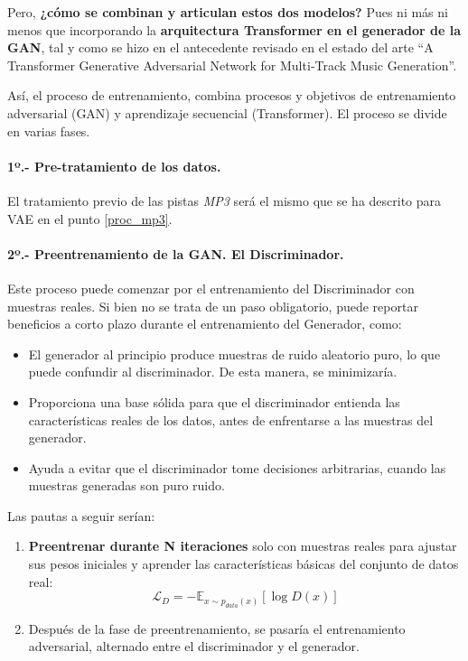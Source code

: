 Pero, \textbf{¿cómo se combinan y articulan estos dos modelos?} Pues ni más ni menos que incorporando la \textbf{arquitectura Transformer en el generador de la GAN}, tal y como se hizo en el antecedente revisado en el estado del arte ``A Transformer Generative Adversarial Network for Multi‐Track Music Generation''\citep{jin2022transformer}.

Así, el proceso de entrenamiento, combina procesos y objetivos de entrenamiento adversarial (GAN) y aprendizaje secuencial (Transformer). El proceso se divide en varias fases.

\paragraph{1º.- Pre-tratamiento de los datos.} 

El tratamiento previo de las pistas \emph{MP3} será el mismo que se ha descrito para VAE en el punto \ref{proc_mp3}.

\paragraph{2º.- Preentrenamiento de la GAN. El Discriminador.} 

Este proceso puede comenzar por el entrenamiento del Discriminador con muestras reales. Si bien no se trata de un paso obligatorio, puede reportar beneficios a corto plazo durante el entrenamiento del Generador, como:

\begin{itemize}
    \item El generador al principio produce muestras de ruido aleatorio puro, lo que puede confundir al discriminador. De esta manera, se minimizaría.
    \item Proporciona una base sólida para que el discriminador entienda las características reales de los datos, antes de enfrentarse a las muestras del generador.
    \item Ayuda a evitar que el discriminador tome decisiones arbitrarias, cuando las muestras generadas son puro ruido.
\end{itemize}

Las pautas a seguir serían:
\begin{enumerate}
    \item \textbf{Preentrenar durante N iteraciones} solo con muestras reales para ajustar sus pesos iniciales y aprender las características básicas del conjunto de datos real:
    \[
    \mathcal{L}_{D} = -\mathbb{E}_{x \sim p_{data}(x)}[\log D(x)]
    \]
    \item Después de la fase de preentrenamiento, se pasaría el entrenamiento adversarial, alternado entre el discriminador y el generador.
\end{enumerate}

